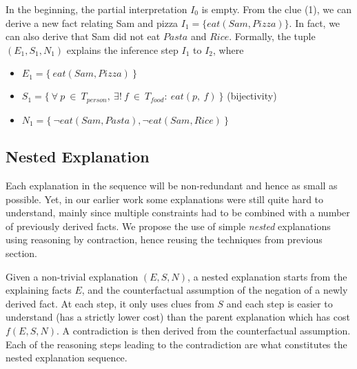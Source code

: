 In the beginning, the partial interpretation $I_0$ is empty. From the clue (1), we can derive a new fact relating Sam and pizza $I_1 = \{eat(Sam, Pizza)\}$. In fact, we can also derive that Sam did not eat $Pasta$ and $Rice$.
Formally, the tuple $(E_1, S_1, N_1)$ explains the inference step $I_1$ to $I_2$, where
\begin{itemize}
   \item $E_1 = \{ \ eat(Sam, Pizza) \ \}$
   \item $S_1 = \{ \ \forall \ p \ \in \ T_{person}, \ \exists! \ f \ \in \ T_{food} :\ eat(p,\ f) \ \}$ (bijectivity)
   \item $N_1 = \{\ \lnot eat(Sam, Pasta), \lnot  eat(Sam, Rice)\ \}$
\end{itemize}


\subsection{Nested Explanation}
Each explanation in the sequence will be non-redundant and hence as small as possible. 
Yet, in our earlier work some explanations were still quite hard to understand, mainly since multiple constraints had to be combined with a number of previously derived facts. 
We propose the use of simple \textit{nested} explanations using reasoning by contraction, hence reusing the techniques from previous section. 

Given a non-trivial explanation $(E,S,N)$, a nested explanation starts from the explaining facts $E$, and the counterfactual assumption of the negation of a newly derived fact. 
At each step, it only uses clues from $S$ and each step is easier to understand (has a strictly lower cost) than the parent explanation which has cost $f(E,S,N)$. 
A contradiction is then derived from the counterfactual assumption.
Each of the reasoning steps leading to the contradiction are what constitutes the nested explanation sequence.
